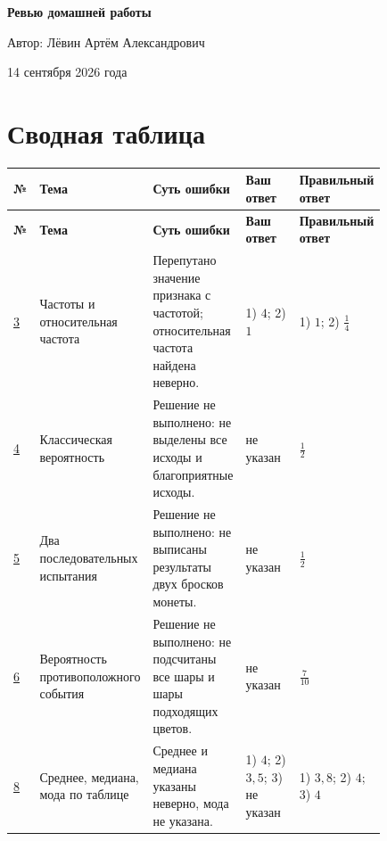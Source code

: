 \documentclass[12pt,a4paper]{article}
\begin{document}
\begin{titlepage}
  \centering
  \vspace*{0.23\textheight}
  {\Huge\bfseries Ревью домашней работы\par}
  \vspace{2cm}
  {\large Автор: Лёвин Артём Александрович\par}
  \vspace{0.7cm}
  {\large 14 сентября 2026 года\par}
  \vfill
  \vspace*{1.2cm}
\end{titlepage}

\newpage
\section*{Сводная таблица}

\small
\begin{longtable}{>{\centering\arraybackslash}p{0.07\linewidth} p{0.17\linewidth} p{0.25\linewidth} p{0.17\linewidth} p{0.17\linewidth}}
\toprule
\textbf{№} & \textbf{Тема} & \textbf{Суть ошибки} & \textbf{Ваш ответ} & \textbf{Правильный ответ} \\
\midrule
\endfirsthead
\toprule
\textbf{№} & \textbf{Тема} & \textbf{Суть ошибки} & \textbf{Ваш ответ} & \textbf{Правильный ответ} \\
\midrule
\endhead
\hyperref[task:3]{3} & Частоты и относительная частота & Перепутано значение признака с частотой; относительная частота найдена неверно. & 1) $4$; 2) $1$ & 1) $1$; 2) $\frac14$ \\
\addlinespace
\hyperref[task:4]{4} & Классическая вероятность & Решение не выполнено: не выделены все исходы и благоприятные исходы. & не указан & $\frac12$ \\
\addlinespace
\hyperref[task:5]{5} & Два последовательных испытания & Решение не выполнено: не выписаны результаты двух бросков монеты. & не указан & $\frac12$ \\
\addlinespace
\hyperref[task:6]{6} & Вероятность противоположного события & Решение не выполнено: не подсчитаны все шары и шары подходящих цветов. & не указан & $\frac7{10}$ \\
\addlinespace
\hyperref[task:8]{8} & Среднее, медиана, мода по таблице & Среднее и медиана указаны неверно, мода не указана. & 1) $4$; 2) $3{,}5$; 3) не указан & 1) $3{,}8$; 2) $4$; 3) $4$ \\
\bottomrule
\end{longtable}
\normalsize
\end{document}
